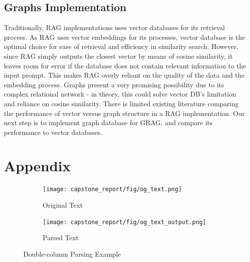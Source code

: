 \documentclass{scrartcl}
\begin{document}
\subsection{Graphs Implementation}
\newline
Traditionally, RAG implementations uses vector databases for its retrieval process. As RAG uses vector embeddings for its processes, vector database is the optimal choice for ease of retrieval and efficiency in similarity search.
However, since RAG simply outputs the closest vector by means of cosine similarity, it leaves room for error if the database does not contain relevant information to the input prompt. This makes RAG overly reliant on the quality of the data and the embedding process.
\newline
\newline
Graphs present a very promising possibility due to its complex relational network - in theory, this could solve vector DB's limitation and reliance on cosine similarity.
There is limited existing literature comparing the performance of vector versus graph structure in a RAG implementation. Our next step is to implement graph database for GRAG, and compare its performance to vector databases.
\newpage






\newpage
\appendix
\section{Appendix}
\begin{figure}[h!]
    \centering
    \begin{subfigure}[b]{0.8\textwidth}
        \texttt{[image: capstone\_report/fig/og\_text.png]}
        \caption{Original Text}
        \label{fig:image1}
    \end{subfigure}

    \begin{subfigure}[b]{0.8\textwidth}
        \texttt{[image: capstone\_report/fig/og\_text\_output.png]}
        \caption{Parsed Text}
        \label{fig:image2}
    \end{subfigure}
    \caption{Double-column Parsing Example}
    \label{fig:images}
\end{figure}
\end{document}
